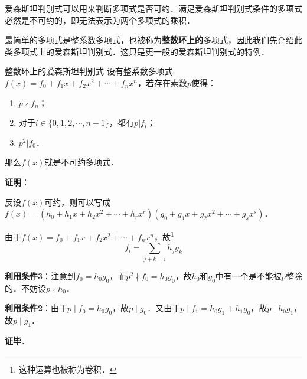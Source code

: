 
爱森斯坦判别式可以用来判断多项式是否可约．满足爱森斯坦判别式条件的多项式必然是不可约的，即无法表示为两个多项式的乘积．

最简单的多项式是整系数多项式，也被称为\textbf{整数环上的}多项式，因此我们先介绍此类多项式上的爱森斯坦判别式．这只是更一般的爱森斯坦判别式的特例．

\begin{theorem}{整数环上的爱森斯坦判别式}
设有整系数多项式$f(x)=f_0+f_1x+f_2x^2+\cdots+f_nx^n$，若存在素数$p$使得：
\begin{enumerate}
\item $p\nmid f_n$；
\item 对于$i\in\{0, 1, 2, \cdots, n-1\}$，都有$p|f_i$；
\item $p^2|f_0$．
\end{enumerate}
那么$f(x)$就是不可约多项式．
\end{theorem}

\textbf{证明}：

反设$f(x)$可约，则可以写成$f(x)=(h_0+h_1x+h_2x^2+\cdots+h_rx^r)(g_0+g_1x+g_2x^2+\cdots+g_sx^s)$．

由于$f(x)=f_0+f_1x+f_2x^2+\cdots+f_nx^n$，故\footnote{这种运算也被称为卷积．}\begin{equation}f_i=\sum\limits_{j+k=i}h_jg_k\end{equation}

\textbf{利用条件3}：注意到$f_0=h_0g_0$，而$p^2\nmid f_0=h_0g_0$，故$h_0$和$g_0$中有一个是不能被$p$整除的．不妨设$p\nmid h_0$．

\textbf{利用条件2}：由于$p\mid f_0=h_0g_0$，故$p\mid g_0$．又由于$p\mid f_1=h_0g_1+h_1g_0$，故$p\mid h_0g_1$，故$p\mid g_1$．




\textbf{证毕}．







